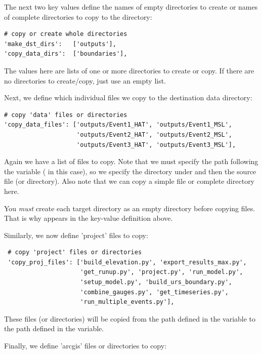 \documentclass{manual}
\begin{document}
The next two key values define the names of empty directories to create or names of
complete directories to copy to the  directory:

\begin{verbatim}
# copy or create whole directories
'make_dst_dirs':   ['outputs'],
'copy_data_dirs':  ['boundaries'],
\end{verbatim}

The values here are lists of one or more directories to create or copy.  If there are no directories
to create/copy, just use an empty list.

\pagebreak

Next, we define which individual files we copy to the destination data directory:

\begin{verbatim}
# copy 'data' files or directories
'copy_data_files': ['outputs/Event1_HAT', 'outputs/Event1_MSL',
                    'outputs/Event2_HAT', 'outputs/Event2_MSL',
                    'outputs/Event3_HAT', 'outputs/Event3_MSL'],
\end{verbatim}

Again we have a list of files to copy.  Note that we must specify the path following the
 variable ( in this case), so we specify the directory under 
 and then the source file (or directory).  Also note that we can copy a simple file
or complete directory here.

You \emph{must} create each target directory as an empty directory before copying files.
That is why  appears in the  key-value definition above.

Similarly, we now define 'project' files to copy:

\begin{verbatim}
 # copy 'project' files or directories
 'copy_proj_files': ['build_elevation.py', 'export_results_max.py',
                     'get_runup.py', 'project.py', 'run_model.py',
                     'setup_model.py', 'build_urs_boundary.py',
                     'combine_gauges.py', 'get_timeseries.py',
                     'run_multiple_events.py'],
\end{verbatim}

These files (or directories) will be copied from the path defined in the 
variable to the path defined in the  variable.

Finally, we define 'arcgis' files or directories to copy:
\end{document}
